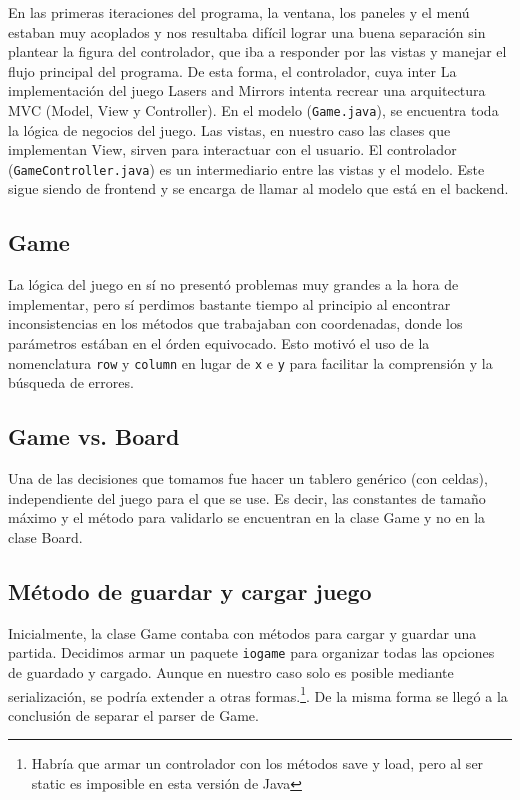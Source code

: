 \documentclass[a4paper, 11pt]{article}
\begin{document}
	En las primeras iteraciones del programa, la ventana, los paneles y el menú estaban muy acoplados y nos resultaba difícil lograr una buena separación sin plantear la figura del controlador, que iba a responder por las vistas y manejar el flujo principal del programa. De esta forma, el controlador, cuya inter La implementación del juego Lasers and Mirrors intenta recrear una arquitectura MVC (Model, View y Controller). En el modelo (\texttt{Game.java}), se encuentra toda la lógica de negocios del juego. Las vistas, en nuestro caso las clases que implementan View, sirven para interactuar con el usuario. El controlador (\texttt{GameController.java}) es un intermediario entre las vistas y el modelo. Este sigue siendo de frontend y se encarga de llamar al modelo que está en el backend.

	\subsection{Game}
	La lógica del juego en sí no presentó problemas muy grandes a la hora de implementar, pero sí perdimos bastante tiempo al principio al encontrar inconsistencias en los métodos que trabajaban con coordenadas, donde los parámetros estában en el órden equivocado. Esto motivó el uso de la nomenclatura \texttt{row} y \texttt{column} en lugar de \texttt{x} e \texttt{y} para facilitar la comprensión y la búsqueda de errores. 

	\subsection{Game vs. Board}
	Una de las decisiones que tomamos fue hacer un tablero genérico (con celdas), independiente del juego para el que se use. Es decir, las constantes de tamaño máximo y el método para validarlo se encuentran en la clase Game y no en la clase Board.
		
	\subsection{Método de guardar y cargar juego}
	Inicialmente, la clase Game contaba con métodos para cargar y guardar una partida. Decidimos armar un paquete \texttt{iogame} para organizar todas las opciones de guardado y cargado. Aunque en nuestro caso solo es posible mediante serialización, se podría extender a otras formas.\footnote{Habría que armar un controlador con los métodos save y load, pero al ser static es imposible en esta versión de Java}. De la misma forma se llegó a la conclusión de separar el parser de Game.
\end{document}
